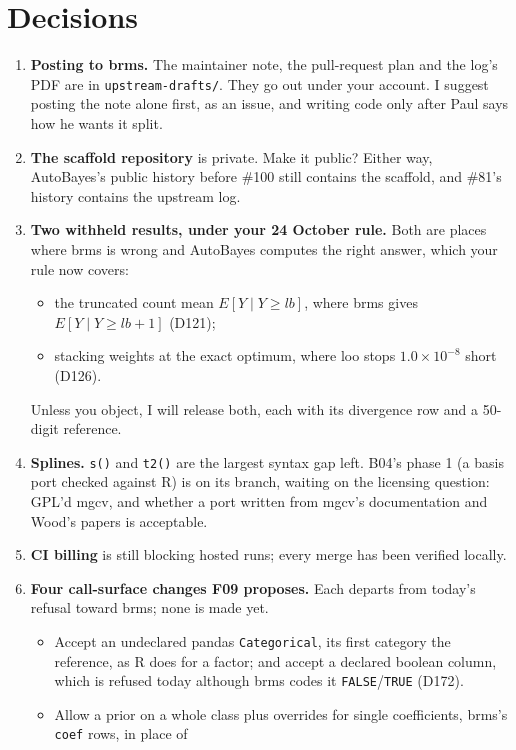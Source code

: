 \documentclass[11pt]{article}
\newcommand{\code}[1]{\texttt{#1}}
\newcommand{\file}[1]{\texttt{#1}}
\begin{document}
\section{Decisions}
\label{sec:decisions}

\begin{enumerate}
\item \textbf{Posting to brms.} The maintainer note, the pull-request plan and the log's PDF are in
  \file{upstream-drafts/}. They go out under your account. I suggest posting the note alone first, as an issue, and
  writing code only after Paul says how he wants it split.
\item \textbf{The scaffold repository} is private. Make it public? Either way, AutoBayes's public history before \#100
  still contains the scaffold, and \#81's history contains the upstream log.
\item \textbf{Two withheld results, under your 24 October rule.} Both are places where brms is wrong and AutoBayes computes
  the right answer, which your rule now covers:
  \begin{itemize}
  \item the truncated count mean $E[Y \mid Y \ge lb]$, where brms gives $E[Y \mid Y \ge lb + 1]$ (D121);
  \item stacking weights at the exact optimum, where loo stops $1.0\times10^{-8}$ short (D126).
  \end{itemize}
  Unless you object, I will release both, each with its divergence row and a 50-digit reference.
\item \textbf{Splines.} \code{s()} and \code{t2()} are the largest syntax gap left. B04's phase 1 (a basis port checked
  against R) is on its branch, waiting on the licensing question: GPL'd mgcv, and whether a port written from mgcv's
  documentation and Wood's papers is acceptable.
\item \textbf{CI billing} is still blocking hosted runs; every merge has been verified locally.
\item \textbf{Four call-surface changes F09 proposes.} Each departs from today's refusal toward brms; none is made yet.
  \begin{itemize}
  \item Accept an undeclared pandas \code{Categorical}, its first category the reference, as R does for a factor; and
    accept a declared boolean column, which is refused today although brms codes it \code{FALSE}/\code{TRUE} (D172).
  \item Allow a prior on a whole class plus overrides for single coefficients, brms's \code{coef} rows, in place of

\end{itemize}
\end{enumerate}
\end{document}
